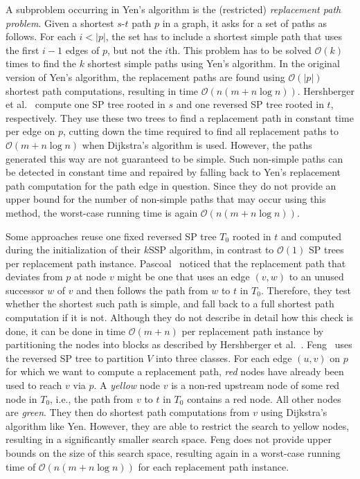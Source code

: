 \documentclass[runningheads,a4paper]{llncs}
\newcommand{\norm}[1]{\left|#1\right|}
\begin{document}
A subproblem occurring in Yen's algorithm is the (restricted) \emph{replacement path problem}.
Given a shortest $s$-$t$ path $p$ in a graph, it asks for a set of paths as follows.
For each $i < \norm{p}$, the set has to include a shortest simple path that uses the first $i-1$ edges of $p$, but not the $i$th.
This problem has to be solved $\mathcal O(k)$ times to find the $k$ shortest simple paths using Yen's algorithm.
In the original version of Yen's algorithm, the replacement paths are found using $\mathcal O(\norm{p})$ shortest path computations, resulting in time $\mathcal O(n(m + n \log n))$.
Hershberger et al.~\cite{DBLP:journals/talg/HershbergerMS07} compute one SP tree rooted in $s$ and one reversed SP tree rooted in $t$, respectively.
They use these two trees to find a replacement path in constant time per edge on $p$, cutting down the time required to find all replacement paths to $\mathcal O(m + n \log n)$ when Dijkstra's algorithm is used.
However, the paths generated this way are not guaranteed to be simple.
Such non-simple paths can be detected in constant time and repaired by falling back to Yen's replacement path computation for the path edge in question.
Since they do not provide an upper bound for the number of non-simple paths that may occur using this method, the worst-case running time is again $\mathcal O(n(m + n \log n))$.

Some approaches reuse one fixed reversed SP tree $T_0$ rooted in $t$ and computed during the initialization of their $k$SSP algorithm, in contrast to $\mathcal O(1)$ SP trees per replacement path instance.
Pascoal~\cite{Pascoal06implementationsand} noticed that the replacement path that deviates from $p$ at node $v$ might be one that uses an edge $(v, w)$ to an unused successor $w$ of $v$ and then follows the path from $w$ to $t$ in $T_0$.
Therefore, they test whether the shortest such path is simple, and fall back to a full shortest path computation if it is not.
Although they do not describe in detail how this check is done, it can be done in time $\mathcal O(m + n)$ per replacement path instance by partitioning the nodes into blocks as described by Hershberger et al.~\cite{DBLP:journals/talg/HershbergerMS07}.
Feng~\cite{DBLP:journals/networks/Feng14} uses the reversed SP tree to partition $V$ into three classes.
For each edge $(u, v)$ on $p$ for which we want to compute a replacement path, \emph{red} nodes have already been used to reach $v$ via $p$.
A \emph{yellow} node $v$ is a non-red upstream node of some red node in $T_0$, i.e., the path from $v$ to $t$ in $T_0$ contains a red node.
All other nodes are \emph{green}.
They then do shortest path computations from $v$ using Dijkstra's algorithm like Yen.
However, they are able to restrict the search to yellow nodes, resulting in a significantly smaller search space.
Feng does not provide upper bounds on the size of this search space, resulting again in a worst-case running time of $\mathcal O(n(m + n \log n))$ for each replacement path instance.
\end{document}
